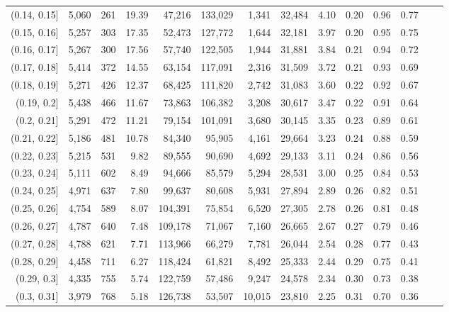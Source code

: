 \begin{tabular}{rrrrrrrrrrrrrr}
(0.14, 0.15]   &  5,060 &  261 &   19.39 &   47,216 &  133,029 &   1,341 &  32,484 &  4.10 &  0.20 &  0.96 &      0.77 \\
(0.15, 0.16]   &  5,257 &  303 &   17.35 &   52,473 &  127,772 &   1,644 &  32,181 &  3.97 &  0.20 &  0.95 &      0.75 \\
(0.16, 0.17]   &  5,267 &  300 &   17.56 &   57,740 &  122,505 &   1,944 &  31,881 &  3.84 &  0.21 &  0.94 &      0.72 \\
(0.17, 0.18]   &  5,414 &  372 &   14.55 &   63,154 &  117,091 &   2,316 &  31,509 &  3.72 &  0.21 &  0.93 &      0.69 \\
(0.18, 0.19]   &  5,271 &  426 &   12.37 &   68,425 &  111,820 &   2,742 &  31,083 &  3.60 &  0.22 &  0.92 &      0.67 \\
(0.19, 0.2]    &  5,438 &  466 &   11.67 &   73,863 &  106,382 &   3,208 &  30,617 &  3.47 &  0.22 &  0.91 &      0.64 \\
(0.2, 0.21]    &  5,291 &  472 &   11.21 &   79,154 &  101,091 &   3,680 &  30,145 &  3.35 &  0.23 &  0.89 &      0.61 \\
(0.21, 0.22]   &  5,186 &  481 &   10.78 &   84,340 &   95,905 &   4,161 &  29,664 &  3.23 &  0.24 &  0.88 &      0.59 \\
(0.22, 0.23]   &  5,215 &  531 &    9.82 &   89,555 &   90,690 &   4,692 &  29,133 &  3.11 &  0.24 &  0.86 &      0.56 \\
(0.23, 0.24]   &  5,111 &  602 &    8.49 &   94,666 &   85,579 &   5,294 &  28,531 &  3.00 &  0.25 &  0.84 &      0.53 \\
(0.24, 0.25]   &  4,971 &  637 &    7.80 &   99,637 &   80,608 &   5,931 &  27,894 &  2.89 &  0.26 &  0.82 &      0.51 \\
(0.25, 0.26]   &  4,754 &  589 &    8.07 &  104,391 &   75,854 &   6,520 &  27,305 &  2.78 &  0.26 &  0.81 &      0.48 \\
(0.26, 0.27]   &  4,787 &  640 &    7.48 &  109,178 &   71,067 &   7,160 &  26,665 &  2.67 &  0.27 &  0.79 &      0.46 \\
(0.27, 0.28]   &  4,788 &  621 &    7.71 &  113,966 &   66,279 &   7,781 &  26,044 &  2.54 &  0.28 &  0.77 &      0.43 \\
(0.28, 0.29]   &  4,458 &  711 &    6.27 &  118,424 &   61,821 &   8,492 &  25,333 &  2.44 &  0.29 &  0.75 &      0.41 \\
(0.29, 0.3]    &  4,335 &  755 &    5.74 &  122,759 &   57,486 &   9,247 &  24,578 &  2.34 &  0.30 &  0.73 &      0.38 \\
(0.3, 0.31]    &  3,979 &  768 &    5.18 &  126,738 &   53,507 &  10,015 &  23,810 &  2.25 &  0.31 &  0.70 &      0.36 \\

\end{tabular}

